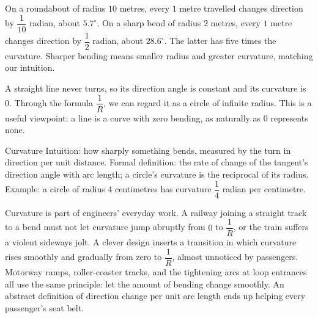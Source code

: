 \begin{li}
On a roundabout of radius $10$ metres, every $1$ metre travelled changes direction by $\dfrac{1}{10}$ radian, about $5.7^\circ$. On a sharp bend of radius $2$ metres, every $1$ metre changes direction by $\dfrac{1}{2}$ radian, about $28.6^\circ$. The latter has five times the curvature. Sharper bending means smaller radius and greater curvature, matching our intuition.
\end{li}

\begin{center}
\end{center}

\begin{zhu}
A straight line never turns, so its direction angle is constant and its curvature is $0$. Through the formula $\dfrac{1}{R}$, we can regard it as a circle of infinite radius. This is a useful viewpoint: a line is a curve with zero bending, as naturally as $0$ represents none.
\end{zhu}

\begin{shuyu}{Curvature}
Intuition: how sharply something bends, measured by the turn in direction per unit distance. Formal definition: the rate of change of the tangent's direction angle with arc length; a circle's curvature is the reciprocal of its radius. Example: a circle of radius $4$ centimetres has curvature $\dfrac{1}{4}$ radian per centimetre.
\end{shuyu}

Curvature is part of engineers' everyday work. A railway joining a straight track to a bend must not let curvature jump abruptly from $0$ to $\dfrac{1}{R}$, or the train suffers a violent sideways jolt. A clever design inserts a transition in which curvature rises smoothly and gradually from zero to $\dfrac{1}{R}$, almost unnoticed by passengers. Motorway ramps, roller-coaster tracks, and the tightening arcs at loop entrances all use the same principle: let the amount of bending change smoothly. An abstract definition of direction change per unit arc length ends up helping every passenger's seat belt.

